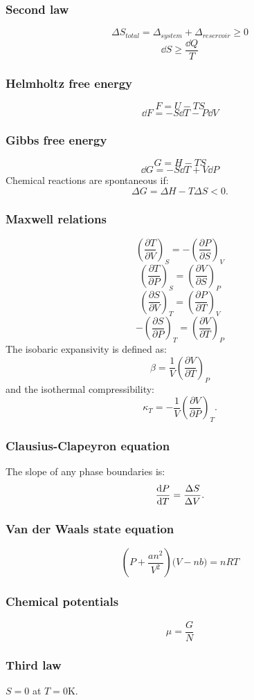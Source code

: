 \documentclass{article}
\begin{document}
\begin{multicols*}{3}
\subsubsection*{Second law}
$$\Delta S_{total}=\Delta_{system}
+\Delta_{reservoir}\geq0$$
$$\dd S\geq\frac{\dd Q}{T}$$

\subsubsection*{Helmholtz free energy}
$$F=U-TS$$
$$\dd F=-S\dd T-P\dd V$$

\subsubsection*{Gibbs free energy}
$$G=H-TS$$
$$\dd G=-S\dd T+V\dd P$$
Chemical reactions are spontaneous if:
$$\Delta G=\Delta H-T\Delta S<0.$$

\subsubsection*{Maxwell relations}
$$\left(\frac{\partial T}{\partial V}\right)_S=-\left(\frac{\partial P}{\partial S}\right)_V$$
$$\left(\frac{\partial T}{\partial P}\right)_S=\left(\frac{\partial V}{\partial S}\right)_P$$
$$\left(\frac{\partial S}{\partial V}\right)_T=\left(\frac{\partial P}{\partial T}\right)_V$$
$$-\left(\frac{\partial S}{\partial P}\right)_T=\left(\frac{\partial V}{\partial T}\right)_P$$
The isobaric expansivity is defined as:
$$\beta=\frac{1}{V}
\left(\frac{\partial V}{\partial T}\right)_P$$
and the isothermal compressibility:
$$\kappa_T=-\frac{1}{V}
\left(\frac{\partial V}{\partial P}\right)_T.$$

\newpage

\subsubsection*{Clausius-Clapeyron equation}
The slope of any phase boundaries is:
$$\dv{P}{T}=\frac{\Delta S}{\Delta V}.$$

\subsubsection*{Van der Waals state equation}
$$\left(P+\frac{an^2}{V^2}\right)
\bigl(V-nb\bigr)=nRT$$

\subsubsection*{Chemical potentials}
$$\mu=\frac{G}{N}$$

\subsubsection*{Third law}
$S=0$ at $T=0$K.

\end{multicols*}
\end{document}
